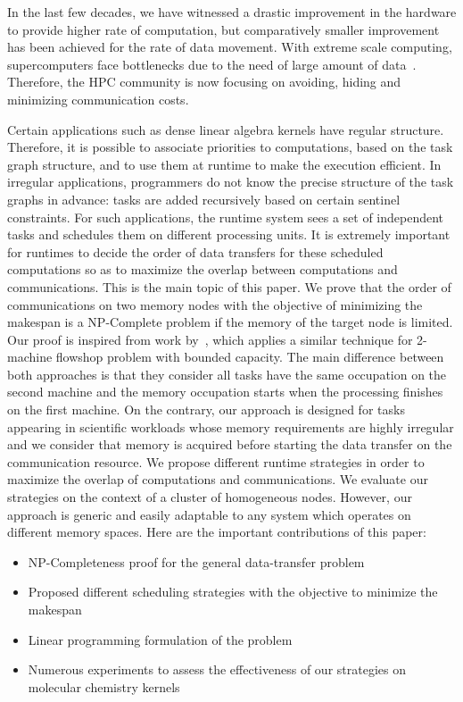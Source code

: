 \documentclass[sigconf]{acmart}
\begin{document}
	
	In the last few decades, we have witnessed a drastic improvement in the hardware to provide higher rate of computation, but comparatively smaller improvement has been achieved for the rate of data movement. With extreme scale computing, supercomputers face bottlenecks due to the need of large amount of data~\cite{ascaccommitteereport2014,yelick2016}. Therefore, the HPC community is now focusing on avoiding, hiding and minimizing communication costs.
	
	
	Certain applications such as dense linear algebra kernels have regular structure. Therefore, it is possible to associate priorities to computations, based on the task graph structure, and to use them at runtime to make the execution efficient. In irregular applications, programmers do not know the precise structure of the task graphs in advance: tasks are added recursively based on certain sentinel constraints. For such applications, the runtime system sees a set of independent tasks and schedules them on different processing units. It is extremely important for runtimes to decide the order of data transfers for these scheduled computations so as to maximize the overlap between computations and communications. This is the main topic of this paper. We prove that the order of communications on two memory nodes with the objective of minimizing the makespan is a NP-Complete problem if the memory of the target node is limited. Our proof is inspired from work by~\cite{Papadimitriou:1980:FSL:322203.322213}, which applies a similar technique for 2-machine flowshop problem with bounded capacity. The main difference between both approaches is that they consider all tasks have the same occupation on the second machine and the memory occupation starts when the processing finishes on the first machine. On the contrary, our approach is designed for tasks appearing in scientific workloads whose memory requirements are highly irregular and we consider that memory is acquired before starting the data transfer on the communication resource. We propose different runtime strategies in order to maximize the overlap of computations and communications. We evaluate our strategies on the context of a cluster of homogeneous nodes. However, our approach is generic and easily adaptable to any system which operates on different memory spaces. Here are the important contributions of this paper:
	
	
	\renewcommand{\labelitemi}{$\bullet$}
	\begin{itemize}
		\item NP-Completeness proof for the general data-transfer problem 
		\item Proposed different scheduling strategies with the objective to minimize the makespan
		\item Linear programming formulation of the problem
		\item Numerous experiments to assess the effectiveness of our strategies on molecular chemistry kernels 
	\end{itemize}
	
\end{document}

